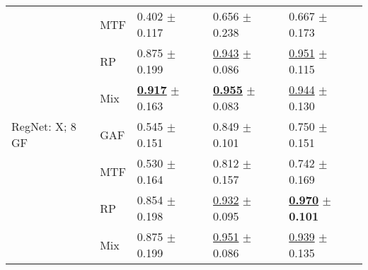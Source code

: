 \begin{tabular}{lllll}
 & MTF & \textcolor[rgb]{1.0000000000,0.0000000000,0}{0.402} $\pm$ \textcolor[rgb]{0.4173650062,0.5000000000,0}{0.117} & \textcolor[rgb]{1.0000000000,0.0000000000,0}{0.656} $\pm$ \textcolor[rgb]{0.9883576976,0.0116423024,0}{0.238} & \textcolor[rgb]{0.9424083770,0.0575916230,0}{0.667} $\pm$ \textcolor[rgb]{0.3509958762,0.5000000000,0}{0.173} \\
 & RP & \textcolor[rgb]{0.0808823529,0.5000000000,0}{0.875} $\pm$ \textcolor[rgb]{0.7127864450,0.2872135550,0}{0.199} & \underline{\textcolor[rgb]{0.0398406375,0.5000000000,0}{0.943}} $\pm$ \textcolor[rgb]{0.1408376023,0.5000000000,0}{0.086} & \underline{\textcolor[rgb]{0.0569371728,0.5000000000,0}{0.951}} $\pm$ \textcolor[rgb]{0.0702311536,0.5000000000,0}{0.115} \\
 & Mix & \underline{\textbf{\textcolor[rgb]{0.0000000000,0.5000000000,0}{0.917}}} $\pm$ \textcolor[rgb]{0.5819876952,0.4180123048,0}{0.163} & \underline{\textbf{\textcolor[rgb]{0.0000000000,0.5000000000,0}{0.955}}} $\pm$ \textcolor[rgb]{0.1234823448,0.5000000000,0}{0.083} & \underline{\textcolor[rgb]{0.0785340314,0.5000000000,0}{0.944}} $\pm$ \textcolor[rgb]{0.1425478198,0.5000000000,0}{0.130} \\
RegNet: X; 8 GF & GAF & \textcolor[rgb]{0.7205882353,0.2794117647,0}{0.545} $\pm$ \textcolor[rgb]{0.5388159061,0.4611840939,0}{0.151} & \textcolor[rgb]{0.3532536521,0.5000000000,0}{0.849} $\pm$ \textcolor[rgb]{0.2248426669,0.5000000000,0}{0.101} & \textcolor[rgb]{0.6832460733,0.3167539267,0}{0.750} $\pm$ \textcolor[rgb]{0.2449321979,0.5000000000,0}{0.151} \\
 & MTF & \textcolor[rgb]{0.7500000000,0.2500000000,0}{0.530} $\pm$ \textcolor[rgb]{0.5847524980,0.4152475020,0}{0.164} & \textcolor[rgb]{0.4780876494,0.5000000000,0}{0.812} $\pm$ \textcolor[rgb]{0.5338881645,0.4661118355,0}{0.157} & \textcolor[rgb]{0.7091623037,0.2908376963,0}{0.742} $\pm$ \textcolor[rgb]{0.3325754726,0.5000000000,0}{0.169} \\
 & RP & \textcolor[rgb]{0.1213235294,0.5000000000,0}{0.854} $\pm$ \textcolor[rgb]{0.7085309655,0.2914690345,0}{0.198} & \underline{\textcolor[rgb]{0.0746106483,0.5000000000,0}{0.932}} $\pm$ \textcolor[rgb]{0.1902677072,0.5000000000,0}{0.095} & \underline{\textbf{\textcolor[rgb]{0.0000000000,0.5000000000,0}{0.970}}} $\pm$ \textbf{\textcolor[rgb]{0.0000000000,0.5000000000,0}{0.101}} \\
 & Mix & \textcolor[rgb]{0.0808823529,0.5000000000,0}{0.875} $\pm$ \textcolor[rgb]{0.7127864450,0.2872135550,0}{0.199} & \underline{\textcolor[rgb]{0.0137631293,0.5000000000,0}{0.951}} $\pm$ \textcolor[rgb]{0.1389089621,0.5000000000,0}{0.086} & \underline{\textcolor[rgb]{0.0942408377,0.5000000000,0}{0.939}} $\pm$ \textcolor[rgb]{0.1673576575,0.5000000000,0}{0.135} \\

\end{tabular}
